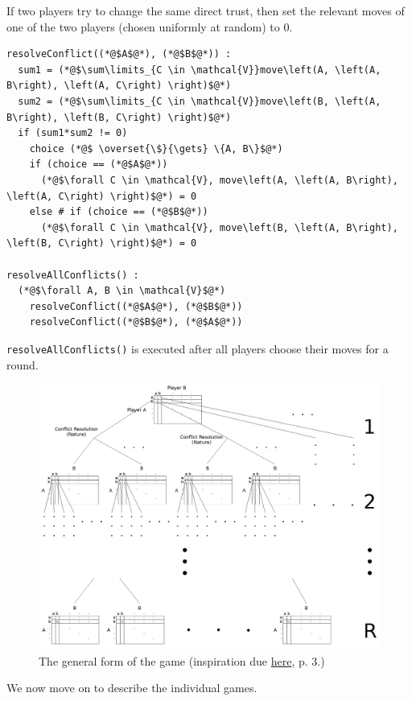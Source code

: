   If two players try to change the same direct trust, then set the relevant moves of one of the two players (chosen uniformly
  at random) to 0.
  \begin{lstlisting}[label=conflict, style=numbers]
resolveConflict((*@$A$@*), (*@$B$@*)) :
  sum1 = (*@$\sum\limits_{C \in \mathcal{V}}move\left(A, \left(A, B\right), \left(A, C\right) \right)$@*)
  sum2 = (*@$\sum\limits_{C \in \mathcal{V}}move\left(B, \left(A, B\right), \left(B, C\right) \right)$@*)
  if (sum1*sum2 != 0)
    choice (*@$ \overset{\$}{\gets} \{A, B\}$@*)
    if (choice == (*@$A$@*))
      (*@$\forall C \in \mathcal{V}, move\left(A, \left(A, B\right), \left(A, C\right) \right)$@*) = 0
    else # if (choice == (*@$B$@*))
      (*@$\forall C \in \mathcal{V}, move\left(B, \left(A, B\right), \left(B, C\right) \right)$@*) = 0

resolveAllConflicts() :
  (*@$\forall A, B \in \mathcal{V}$@*)
    resolveConflict((*@$A$@*), (*@$B$@*))
    resolveConflict((*@$B$@*), (*@$A$@*))
  \end{lstlisting}

  \noindent \texttt{resolveAllConflicts()} is executed after all players choose their moves for a round.

  \begin{figure}[h]
  \label{fig:game}
    \centering
    \includegraphics[width=\textwidth]{game}
    \caption{The general form of the game (inspiration due
    \href{http://www.agsm.edu.au/bobm/teaching/SGTM/lect06pr-3.pdf}{here}, p. 3.)}
  \end{figure}
  
  \noindent We now move on to describe the individual games.
